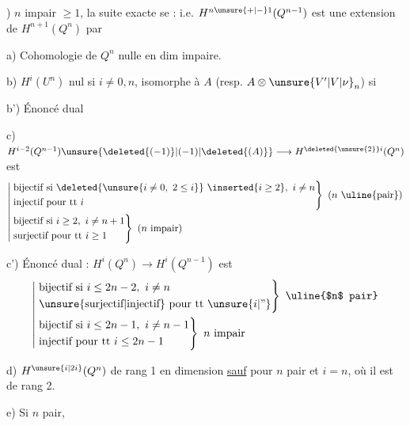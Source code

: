 ) $n$ impair $\geq1$, la suite exacte se  :
i.e. $H^{n\unsure{+|-}1}(Q^{n-1})$ est une extension de $H^{n+1}(Q^n)$ par

a) Cohomologie de $Q^n$ nulle en dim impaire.

b) $H^i(U^n)$ nul si $i\ne0,n$, isomorphe à $A$ (resp. $A\otimes \unsure{V'|V|\nu}_n$) si 

b') Énoncé dual

c) $H^{i-2}(Q^{n-1})\unsure{\deleted{(-1)}|(-1)|\deleted{(A)}}\longrightarrow H^{\deleted{\unsure{2}}i}(Q^n)$ est
\[
\left|\begin{aligned}
&\left.\begin{aligned}
&\text{bijectif si }\deleted{\unsure{i\ne0,\ 2\leq i}}\ \inserted{i\geq2},\ i\ne n\\
&\text{injectif pour tt }i
\end{aligned}\right\}\ (n\ \text{\uline{pair}})\\
&\left.\begin{aligned}
&\text{bijectif si }i\geq2,\ i\ne n+1\\
&\text{surjectif pour tt }i\geq1
\end{aligned}\right\}\ (n\text{ impair})
\end{aligned}\right.
\]

c') Énoncé dual : $H^i(Q^n)\longrightarrow H^i(Q^{n-1})$ est
\[
\left|\begin{aligned}
&\left.\begin{aligned}
&\text{bijectif si }i\leq 2n-2,\ i\ne n\\
&\text{\unsure{surjectif|injectif} pour tt } \unsure{i|\text{''}}
\end{aligned}\right\}\ \text{\uline{$n$ pair}}\\
&\left.\begin{aligned}
&\text{bijectif si }i\leq2n-1,\ i\ne n-1\\
&\text{injectif pour tt }i\leq2n-1
\end{aligned}\right\}\ n\text{ impair}
\end{aligned}\right.
\]

d) $H^{\unsure{i|2i}}(Q^n)$   de rang 1 en  dimension  \uline{sauf} pour $n$ pair et  $i=n$, où il est de rang 2.

e) Si $n$ pair,

